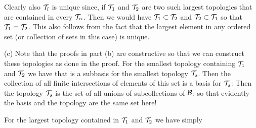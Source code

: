 {{    Clearly also $\mathcal{T}_l$ is unique since, if $\mathcal{T}_1$ and $\mathcal{T}_2$ are two such largest topologies that are contained in every $\mathcal{T}_\alpha$.
    Then we would have $\mathcal{T}_1 \subset \mathcal{T}_2$ and $\mathcal{T}_2 \subset \mathcal{T}_1$ so that $\mathcal{T}_1 = \mathcal{T}_2$.
    This also follows from the fact that the largest element in any ordered set (or collection of sets in this case) is unique.
  }

  (c)
  Note that the proofs in part (b) are constructive so that we can construct these topologies as done in the proof.
  For the smallest topology containing $\mathcal{T}_1$ and $\mathcal{T}_2$ we have that
  is a subbasis for the smallest topology $\mathcal{T}_s$.
  Then the collection of all finite intersections of elements of this set is a basis for $\mathcal{T}_s$:
  Then the topology $\mathcal{T}_s$ is the set of all unions of subcollections of $\mathcal{B}$:
  so that evidently the basis and the topology are the same set here!

  For the largest topology contained in $\mathcal{T}_1$ and $\mathcal{T}_2$ we have simply
}

